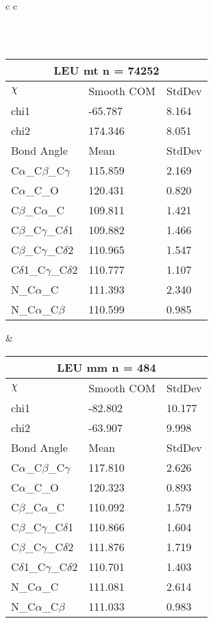 \begin{longtable}{ c c }
\begin{tabular}{ l l l }
  \bottomrule
  \end{tabular}
  \\
  \begin{tabular}{ l l l }
  \toprule
  \multicolumn{3}{c}{LEU \textbf{mt} n = 74252} \\ \toprule
  $\chi$       & Smooth COM & StdDev \\ \midrule
  chi1 & -65.787 & 8.164 \\ 
  chi2 & 174.346 & 8.051 \\ \midrule
  Bond Angle   & Mean     & StdDev \\ \midrule
  C$\alpha$\_C$\beta$\_C$\gamma$ & 115.859 & 2.169\\
  C$\alpha$\_C\_O & 120.431 & 0.820\\
  C$\beta$\_C$\alpha$\_C & 109.811 & 1.421\\
  C$\beta$\_C$\gamma$\_C$\delta$1 & 109.882 & 1.466\\
  C$\beta$\_C$\gamma$\_C$\delta$2 & 110.965 & 1.547\\
  C$\delta$1\_C$\gamma$\_C$\delta$2 & 110.777 & 1.107\\
  N\_C$\alpha$\_C & 111.393 & 2.340\\
  N\_C$\alpha$\_C$\beta$ & 110.599 & 0.985\\
  \bottomrule
  \end{tabular}
  &
  \begin{tabular}{ l l l }
  \toprule
  \multicolumn{3}{c}{LEU \textbf{mm} n = 484} \\ \toprule
  $\chi$       & Smooth COM & StdDev \\ \midrule
  chi1 & -82.802 & 10.177 \\ 
  chi2 & -63.907 & 9.998 \\ \midrule
  Bond Angle   & Mean     & StdDev \\ \midrule
  C$\alpha$\_C$\beta$\_C$\gamma$ & 117.810 & 2.626\\
  C$\alpha$\_C\_O & 120.323 & 0.893\\
  C$\beta$\_C$\alpha$\_C & 110.092 & 1.579\\
  C$\beta$\_C$\gamma$\_C$\delta$1 & 110.866 & 1.604\\
  C$\beta$\_C$\gamma$\_C$\delta$2 & 111.876 & 1.719\\
  C$\delta$1\_C$\gamma$\_C$\delta$2 & 110.701 & 1.403\\
  N\_C$\alpha$\_C & 111.081 & 2.614\\
  N\_C$\alpha$\_C$\beta$ & 111.033 & 0.983\\
  \bottomrule
  \end{tabular}
  \\
  
\end{longtable}    

